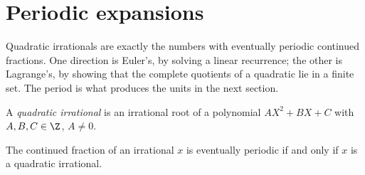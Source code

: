 \section{Periodic expansions}

Quadratic irrationals are exactly the numbers with eventually periodic continued fractions. One direction is Euler's, by solving a linear recurrence; the other is Lagrange's, by showing that the complete quotients of a quadratic lie in a finite set. The period is what produces the units in the next section.

A \emph{quadratic irrational} is an irrational root of a polynomial $AX^2+BX+C$ with $A,B,C\in\Z$, $A\ne0$.

\begin{theorem}\label{thm:periodic}
The continued fraction of an irrational $x$ is eventually periodic if and only if $x$ is a quadratic irrational.
\end{theorem}
